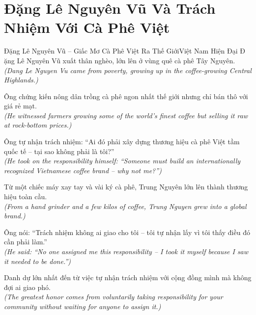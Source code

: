 \section{Đặng Lê Nguyên Vũ Và Trách Nhiệm Với Cà Phê Việt}
\begin{truyen}{Đặng Lê Nguyên Vũ -- Giấc Mơ Cà Phê Việt Ra Thế Giới}{Việt Nam Hiện Đại}
Đ ặng Lê Nguyên Vũ xuất thân nghèo, lớn lên ở vùng quê cà phê Tây Nguyên.\\
\textit{(Dang Le Nguyen Vu came from poverty, growing up in the coffee-growing Central Highlands.)}

Ông chứng kiến nông dân trồng cà phê ngon nhất thế giới nhưng chỉ bán thô với giá rẻ mạt.\\
\textit{(He witnessed farmers growing some of the world's finest coffee but selling it raw at rock-bottom prices.)}

Ông tự nhận trách nhiệm: ``Ai đó phải xây dựng thương hiệu cà phê Việt tầm quốc tế -- tại sao không phải là tôi?''\\
\textit{(He took on the responsibility himself: ``Someone must build an internationally recognized Vietnamese coffee brand -- why not me?'')}

Từ một chiếc máy xay tay và vài ký cà phê, Trung Nguyên lớn lên thành thương hiệu toàn cầu.\\
\textit{(From a hand grinder and a few kilos of coffee, Trung Nguyen grew into a global brand.)}

Ông nói: ``Trách nhiệm không ai giao cho tôi -- tôi tự nhận lấy vì tôi thấy điều đó cần phải làm.''\\
\textit{(He said: ``No one assigned me this responsibility -- I took it myself because I saw it needed to be done.'')}

\end{truyen}
\begin{baihoc}
  Danh dự lớn nhất đến từ việc tự nhận trách nhiệm với cộng đồng mình mà không đợi ai giao phó.\\
  \textit{(The greatest honor comes from voluntarily taking responsibility for your community without waiting for anyone to assign it.)}
\end{baihoc}

